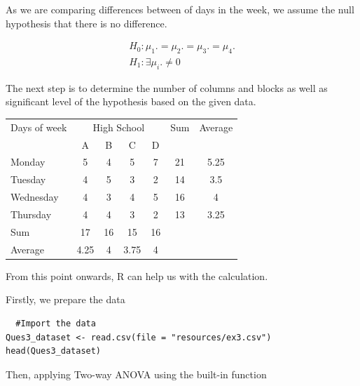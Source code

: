 \documentclass[a4paper]{article}
\numberwithin{equation}{section}
\begin{document}
As we are comparing differences between of days in the week, we assume the null hypothesis that there is no difference.

\begin{align*}
  H_0: \mu_1. = \mu_2. = \mu_3. = \mu_4. \\
  H_1: \exists\mu_i. \neq 0
\end{align*}

The next step is to determine the number of columns and blocks as well as significant level of the hypothesis based on the given data.

\begin{center}
  \begin{tabular}{lcccccc}
    \toprule
    Days of week & \multicolumn{4}{c}{High School} & Sum & Average                  \\
    \cmidrule(lr){2-5}
                 & A                               & B   & C       & D              \\
    \midrule
    Monday       & 5                               & 4   & 5       & 7  & 21 & 5.25 \\
    Tuesday      & 4                               & 5   & 3       & 2  & 14 & 3.5  \\
    Wednesday    & 4                               & 3   & 4       & 5  & 16 & 4    \\
    Thursday     & 4                               & 4   & 3       & 2  & 13 & 3.25 \\
    \midrule
    Sum          & 17                              & 16  & 15      & 16             \\
    Average      & 4.25                            & 4   & 3.75    & 4              \\
    \bottomrule
  \end{tabular}
\end{center}

From this point onwards, R can help us with the calculation.

Firstly, we prepare the data
\begin{mdframed}[leftline=false,rightline=false,backgroundcolor=magenta!10,nobreak=true]
  \begin{verbatim}
  #Import the data
Ques3_dataset <- read.csv(file = "resources/ex3.csv")
head(Ques3_dataset)
    \end{verbatim}
\end{mdframed}

Then, applying Two-way ANOVA using the built-in function
\end{document}
